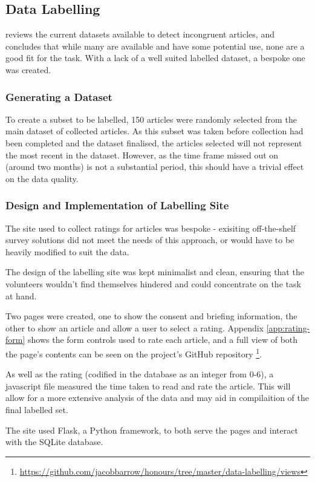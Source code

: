 \subsection{Data Labelling}
 reviews the current datasets available to detect incongruent articles, and concludes that while many are available and have some potential use, none are a good fit for the task. With a lack of a well suited labelled dataset, a bespoke one was created.

\subsubsection{Generating a Dataset}
To create a subset to be labelled, 150 articles were randomly selected from the main dataset of collected articles. As this subset was taken before collection had been completed and the dataset finalised, the articles selected will not represent the most recent in the dataset. However, as the time frame missed out on (around two months) is not a substantial period, this should have a trivial effect on the data quality.

\subsubsection{Design and Implementation of Labelling Site}
The site used to collect ratings for articles was bespoke - exisiting off-the-shelf survey solutions did not meet the needs of this approach, or would have to be heavily modified to suit the data.

The design of the labelling site was kept minimalist and clean, ensuring that the volunteers wouldn't find themselves hindered and could concentrate on the task at hand. 

Two pages were created, one to show the consent and briefing information, the other to show an article and allow a user to select a rating. Appendix \ref{app:rating-form} shows the form controls used to rate each article, and a full view of both the page's contents can be seen on the project's GitHub repository \footnote{\url{https://github.com/jacobbarrow/honours/tree/master/data-labelling/views}}.

As well as the rating (codified in the database as an integer from 0-6), a javascript file measured the time taken to read and rate the article. This will allow for a more extensive analysis of the data and may aid in compilaition of the final labelled set.

The site used Flask, a Python framework, to both serve the pages and interact with the SQLite database.

